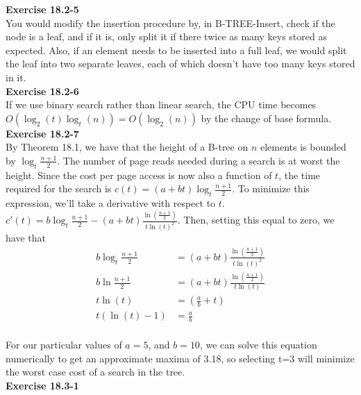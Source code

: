 \documentclass{article}
\begin{document}
\noindent\textbf{Exercise 18.2-5}\\

You would modify the insertion procedure by, in B-TREE-Insert, check if the node is a leaf, and if it is, only split it if there twice as many keys stored as expected. Also, if an element needs to be inserted into a full leaf, we would split the leaf into two separate leaves, each of which doesn't have too many keys stored in it.\\

\noindent\textbf{Exercise 18.2-6}\\

If we use binary search rather than linear search, the CPU time becomes $O(\log_2(t)\log_t(n)) = O(\log_2(n))$ by the change of base formula.\\

\noindent\textbf{Exercise 18.2-7}\\

By Theorem 18.1, we have that the height  of a B-tree on $n$ elements is bounded by $\log_t \frac{n+1}{2}$. The number of page reads needed during a search is at worst the height. Since the cost per page access is now also a function of $t$, the time required for the search is $c(t) = (a+bt)\log_t \frac{n+1}{2}$. To minimize this expression, we'll take a derivative with respect to $t$. $c'(t) = b \log_t\frac{n+1}{2} - (a+bt) \frac{\ln\left(\frac{n+1}{2}\right)}{t \ln(t)^2}$. Then, setting this equal to zero, we have that 
\begin{align*}
b \log_t\frac{n+1}{2} &= (a+bt) \frac{\ln\left(\frac{n+1}{2}\right)}{t \ln(t)^2}\\
b \ln\frac{n+1}{2} &= (a+bt) \frac{\ln\left(\frac{n+1}{2}\right)}{t \ln(t)}\\
t\ln(t) &=(\frac{a}{b} +t)\\
t(\ln(t)-1) &= \frac{a}{b}\\
\end{align*}

For our particular values of $a=5$, and $b=10$, we can solve this equation numerically to get an approximate maxima of 3.18, so selecting t=3 will minimize the worst case cost of a search in the tree.\\



\noindent\textbf{Exercise 18.3-1}\\

\end{document}
